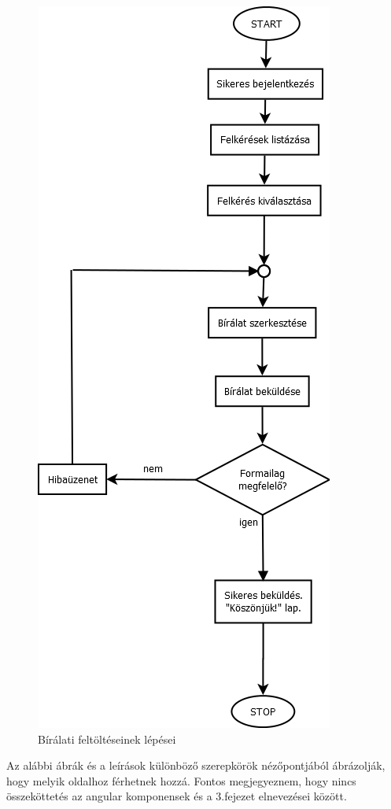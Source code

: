 \begin{figure}[h]
\centering
\includegraphics[scale=0.5]{images/Bírálat_feltöltése.png}
\caption{Bírálati feltöltéseinek lépései}
\label{fig:birala_feltoltese}
\end{figure}

\newpage


Az alábbi ábrák és a leírások különböző szerepkörök nézőpontjából ábrázolják, hogy melyik oldalhoz férhetnek hozzá. Fontos megjegyeznem, hogy nincs összeköttetés az angular komponensek és a 3.fejezet elnevezései között.

